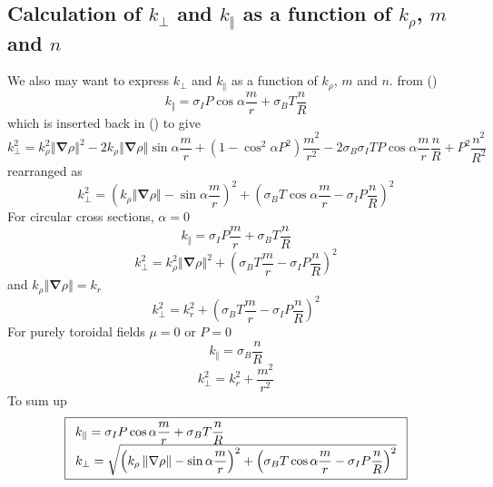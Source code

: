 \documentclass[a4paper,12pt]{article}%
\begin{document}
\subsection{Calculation of $k_{\bot}$ and $k_{\Vert}$ as a function of
$k_{\rho}$, $m$ and $n$}

We also may want to express $k_{\bot}$ and $k_{\Vert}$ as a function of
$k_{\rho}$, $m$ and $n$. from ()%
\begin{equation}
k_{\Vert}=\sigma_{I}P\cos\alpha\dfrac{m}{r}+\sigma_{B}T\dfrac{n}{R}%
\end{equation}
which is inserted back in () to give
\begin{equation}
k_{\bot}^{2}=k_{\rho}^{2}\left\Vert \mathbf{\nabla}\rho\right\Vert
^{2}-2k_{\rho}\left\Vert \mathbf{\nabla}\rho\right\Vert \sin\alpha\dfrac{m}%
{r}+\left(  1-\cos^{2}\alpha P^{2}\right)  \dfrac{m^{2}}{r^{2}}-2\sigma
_{B}\sigma_{I}TP\cos\alpha\dfrac{m}{r}\dfrac{n}{R}+P^{2}\dfrac{n^{2}}{R^{2}}%
\end{equation}
rearranged as%
\begin{equation}
k_{\bot}^{2}=\left(  k_{\rho}\left\Vert \mathbf{\nabla}\rho\right\Vert
-\sin\alpha\dfrac{m}{r}\right)  ^{2}+\left(  \sigma_{B}T\cos\alpha\dfrac{m}%
{r}-\sigma_{I}P\dfrac{n}{R}\right)  ^{2}%
\end{equation}
For circular cross sections, $\alpha=0$%
\begin{equation}
k_{\Vert}=\sigma_{I}P\dfrac{m}{r}+\sigma_{B}T\dfrac{n}{R}%
\end{equation}
\begin{equation}
k_{\bot}^{2}=k_{\rho}^{2}\left\Vert \mathbf{\nabla}\rho\right\Vert
^{2}+\left(  \sigma_{B}T\dfrac{m}{r}-\sigma_{I}P\dfrac{n}{R}\right)  ^{2}%
\end{equation}
and $k_{\rho}\left\Vert \mathbf{\nabla}\rho\right\Vert =k_{r}$%
\begin{equation}
k_{\bot}^{2}=k_{r}^{2}+\left(  \sigma_{B}T\dfrac{m}{r}-\sigma_{I}P\dfrac{n}%
{R}\right)  ^{2}%
\end{equation}
For purely toroidal fields $\mu=0$ or $P=0$%
\begin{equation}
k_{\Vert}=\sigma_{B}\dfrac{n}{R}%
\end{equation}%
\begin{equation}
k_{\bot}^{2}=k_{r}^{2}+\dfrac{m^{2}}{r^{2}}%
\end{equation}
To sum up%
\begin{equation}
\fbox{$%
\begin{array}
[c]{l}%
k_{\Vert}=\sigma_{I}P\cos\alpha\dfrac{m}{r}+\sigma_{B}T\dfrac{n}{R}\\
k_{\bot}=\sqrt{\left(  k_{\rho}\left\Vert \mathbf{\nabla}\rho\right\Vert
-\sin\alpha\dfrac{m}{r}\right)  ^{2}+\left(  \sigma_{B}T\cos\alpha\dfrac{m}%
{r}-\sigma_{I}P\dfrac{n}{R}\right)  ^{2}}%
\end{array}
$}%
\end{equation}
\end{document}
